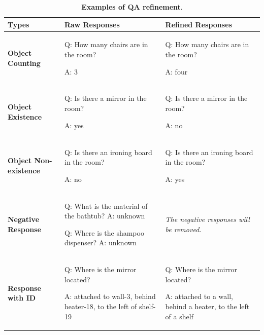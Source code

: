 \begin{table}[t!]
    \centering
    \small
    \caption{\textbf{Examples of QA refinement}.}
    \begin{tabular}{l|p{4.5cm}|p{4.5cm}}
        \toprule
        \textbf{Types} & \textbf{Raw Responses} & \textbf{Refined Responses}\\
        \midrule
        \textbf{Object Counting} & Q: How many chairs are in the room?

        A: 3
        & Q: How many chairs are in the room?

        A: four \\
        \midrule
        \textbf{Object Existence} & Q: Is there a mirror in the room?
        
        A: yes
        & Q: Is there a mirror in the room?
        
        A: no
        \\
        \midrule
        \textbf{Object Non-existence} & Q: Is there an ironing board in the room?
        
        A: no
        &Q: Is there an ironing board in the room?
        
        A: yes
        \\
        \midrule
        \textbf{Negative Response} &  
        Q: What is the material of the bathtub?
        A: unknown

        Q: Where is the shampoo dispenser?
        A: unknown
        &
        \textit{The negative responses will be removed.} \\
        \midrule
        \textbf{Response with ID}  & Q: Where is the mirror located?

        A: attached to wall-3, behind heater-18, to the left of shelf-19
        &
        Q: Where is the mirror located?

        A: attached to a wall, behind a heater, to the left of a shelf
        \\
        \bottomrule
    \end{tabular}
    \label{tab:qa_refinement}
\end{table}

